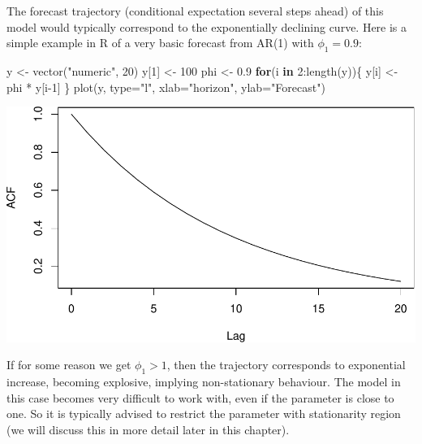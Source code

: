 \documentclass[
]{book}
\newenvironment{Shaded}{\begin{snugshade}}{\end{snugshade}}
\newcommand{\AttributeTok}[1]{\textcolor[rgb]{0.77,0.63,0.00}{#1}}
\newcommand{\ControlFlowTok}[1]{\textcolor[rgb]{0.13,0.29,0.53}{\textbf{#1}}}
\newcommand{\DecValTok}[1]{\textcolor[rgb]{0.00,0.00,0.81}{#1}}
\newcommand{\FloatTok}[1]{\textcolor[rgb]{0.00,0.00,0.81}{#1}}
\newcommand{\FunctionTok}[1]{\textcolor[rgb]{0.00,0.00,0.00}{#1}}
\newcommand{\NormalTok}[1]{#1}
\newcommand{\OtherTok}[1]{\textcolor[rgb]{0.56,0.35,0.01}{#1}}
\newcommand{\SpecialCharTok}[1]{\textcolor[rgb]{0.00,0.00,0.00}{#1}}
\newcommand{\StringTok}[1]{\textcolor[rgb]{0.31,0.60,0.02}{#1}}
\theoremstyle{definition}
\theoremstyle{definition}
\theoremstyle{definition}
\theoremstyle{definition}
\theoremstyle{remark}
\begin{document}
The forecast trajectory (conditional expectation several steps ahead) of this model would typically correspond to the exponentially declining curve. Here is a simple example in R of a very basic forecast from AR(1) with \(\phi_1=0.9\):

\begin{Shaded}
\begin{Highlighting}[]
\NormalTok{y }\OtherTok{\textless{}{-}} \FunctionTok{vector}\NormalTok{(}\StringTok{"numeric"}\NormalTok{, }\DecValTok{20}\NormalTok{)}
\NormalTok{y[}\DecValTok{1}\NormalTok{] }\OtherTok{\textless{}{-}} \DecValTok{100}
\NormalTok{phi }\OtherTok{\textless{}{-}} \FloatTok{0.9}
\ControlFlowTok{for}\NormalTok{(i }\ControlFlowTok{in} \DecValTok{2}\SpecialCharTok{:}\FunctionTok{length}\NormalTok{(y))\{}
\NormalTok{    y[i] }\OtherTok{\textless{}{-}}\NormalTok{ phi }\SpecialCharTok{*}\NormalTok{ y[i}\DecValTok{{-}1}\NormalTok{]}
\NormalTok{\}}
\FunctionTok{plot}\NormalTok{(y, }\AttributeTok{type=}\StringTok{"l"}\NormalTok{, }\AttributeTok{xlab=}\StringTok{"horizon"}\NormalTok{, }\AttributeTok{ylab=}\StringTok{"Forecast"}\NormalTok{)}
\end{Highlighting}
\end{Shaded}

\includegraphics{adam_files/figure-latex/unnamed-chunk-46-1.pdf}

If for some reason we get \(\phi_1>1\), then the trajectory corresponds to exponential increase, becoming explosive, implying non-stationary behaviour. The model in this case becomes very difficult to work with, even if the parameter is close to one. So it is typically advised to restrict the parameter with stationarity region (we will discuss this in more detail later in this chapter).
\end{document}
